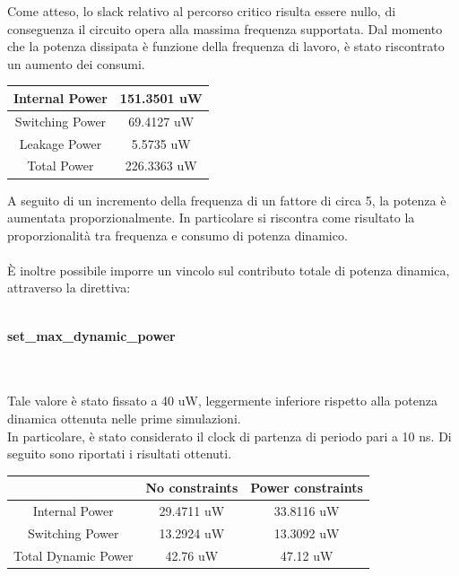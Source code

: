 \documentclass[11pt,  english, makeidx, a4paper, titlepage, oneside]{book}
\begin{document}
\vspace{0.3cm} 
Come atteso, lo slack relativo al percorso critico risulta essere nullo, di conseguenza il circuito opera alla massima frequenza supportata.
Dal momento che la potenza dissipata è funzione della frequenza di lavoro, è stato riscontrato un aumento dei consumi.
\\
\begin{center}
	\begin{tabular}{|c|c|}
	\hline
	Internal Power & 151.3501 uW \\
	\hline
	Switching Power & 69.4127 uW \\
	\hline
	Leakage Power & 5.5735 uW \\
	\hline
	Total Power & 226.3363 uW \\
	\hline
	\end{tabular}	
\end{center}
\vspace{0.3cm} 
A seguito di un incremento della frequenza di un fattore di circa 5, la potenza è aumentata proporzionalmente. In particolare si riscontra come risultato la proporzionalità tra frequenza e consumo di potenza dinamico.
\\\\
È inoltre possibile imporre un vincolo sul contributo totale di potenza dinamica, attraverso la direttiva:
\\\\
\centerline{\textbf{set\_max\_dynamic\_power}}
\\\\
Tale valore è stato fissato a 40 uW, leggermente inferiore rispetto alla potenza dinamica ottenuta nelle prime simulazioni.
\\
In particolare, è stato considerato il clock di partenza di periodo pari a 10 ns.
Di seguito sono riportati i risultati ottenuti.
\\
\begin{center}
	\begin{tabular}{|c|c|c|}
	\hline
	& No constraints & Power constraints\\
	\hline
	Internal Power & 29.4711 uW & 33.8116 uW \\
	\hline
	Switching Power & 13.2924 uW & 13.3092 uW \\
	\hline
	Total Dynamic Power & 42.76 uW & 47.12 uW \\
	\hline
	\end{tabular}	
\end{center}
\vspace{0.3cm}  
\end{document}
